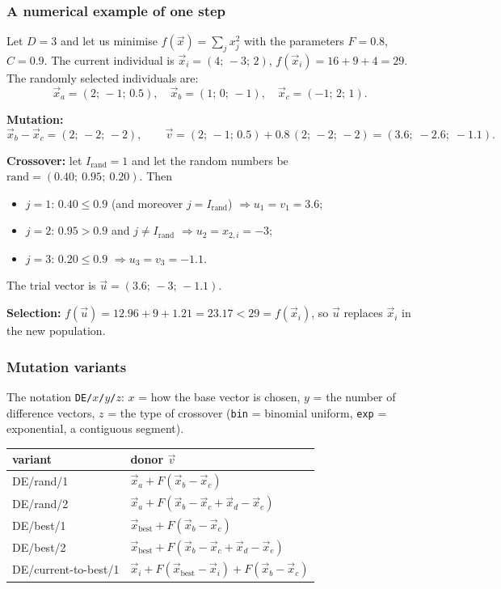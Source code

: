 \documentclass[11pt,a4paper]{article}
\theoremstyle{definition}
\begin{document}
\subsubsection{A numerical example of one step}

Let $D = 3$ and let us minimise $f(\vec x) = \sum_j x_j^2$ with the parameters
$F = 0.8$, $C = 0.9$. The current individual is
$\vec x_i = (4;\, -3;\, 2)$, $f(\vec x_i) = 16+9+4 = 29$.
The randomly selected individuals are:
\[
\vec x_a = (2;\, -1;\, 0.5), \quad
\vec x_b = (1;\, 0;\, -1), \quad
\vec x_c = (-1;\, 2;\, 1).
\]

\textbf{Mutation:}
\[
\vec x_b - \vec x_c = (2;\, -2;\, -2), \qquad
\vec v = (2;\,-1;\,0.5) + 0.8\,(2;\,-2;\,-2) = (3.6;\; -2.6;\; -1.1).
\]

\textbf{Crossover:} let $I_{\mathrm{rand}} = 1$ and let the random numbers be
$\mathrm{rand} = (0.40;\ 0.95;\ 0.20)$. Then
\begin{itemize}
\item $j=1$: $0.40 \le 0.9$ (and moreover $j = I_{\mathrm{rand}}$) $\Rightarrow u_1 = v_1 = 3.6$;
\item $j=2$: $0.95 > 0.9$ and $j \ne I_{\mathrm{rand}}$ $\Rightarrow u_2 = x_{2,i} = -3$;
\item $j=3$: $0.20 \le 0.9$ $\Rightarrow u_3 = v_3 = -1.1$.
\end{itemize}
The trial vector is $\vec u = (3.6;\, -3;\, -1.1)$.

\textbf{Selection:} $f(\vec u) = 12.96 + 9 + 1.21 = 23.17 < 29 = f(\vec x_i)$,
so $\vec u$ replaces $\vec x_i$ in the new population.

\subsubsection{Mutation variants}

The notation \texttt{DE/$x$/$y$/$z$}: $x$ = how the base vector is chosen,
$y$ = the number of difference vectors, $z$ = the type of crossover
(\texttt{bin} = binomial uniform, \texttt{exp} = exponential, a contiguous
segment).

\begin{center}
\begin{tabular}{@{}ll@{}}
\toprule
\textbf{variant} & \textbf{donor $\vec v$} \\
\midrule
DE/rand/1 & $\vec x_a + F(\vec x_b - \vec x_c)$ \\
DE/rand/2 & $\vec x_a + F(\vec x_b - \vec x_c + \vec x_d - \vec x_e)$ \\
DE/best/1 & $\vec x_{\mathrm{best}} + F(\vec x_b - \vec x_c)$ \\
DE/best/2 & $\vec x_{\mathrm{best}} + F(\vec x_b - \vec x_c + \vec x_d - \vec x_e)$ \\
DE/current-to-best/1 & $\vec x_i + F(\vec x_{\mathrm{best}} - \vec x_i) + F(\vec x_b - \vec x_c)$ \\
\bottomrule
\end{tabular}
\end{center}
\end{document}
